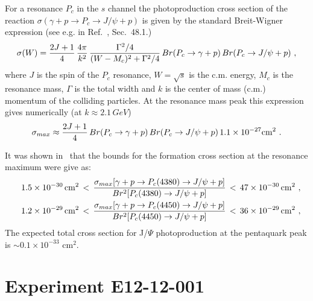\documentclass[12pt]{revtex4}
\begin{document}
For a resonance $P_c$ in the $s$ channel the photoproduction cross section of the reaction 
$\sigma(\gamma + p \to P_c \to J/\psi + p)$
is given by the standard Breit-Wigner expression (see e.g. in Ref.~\cite{pdg}, Sec.~48.1.)
\begin{equation}
\sigma(W) = { 2 J +1 \over 4} \, {4 \pi \over k^2} \, {\Gamma^2/4 \over (W-M_c)^2 + \Gamma^2/4} \, Br(P_c \to \gamma + p) \, Br(P_c \to J/\psi +p)~,
\label{bw}
\end{equation}
where $J$ is the spin of the $P_c$ resonance, $W=\sqrt{s}$  is the c.m. energy,  $M_c$ is the resonance mass, $\Gamma$ is the total width and $k$ is the center of mass (c.m.) momentum of the colliding particles. At the resonance mass peak this expression gives numerically (at $k \approx 2.1\,GeV$)
\begin{equation}
\sigma_{max}\approx { 2 J +1 \over 4} \, Br(P_c \to \gamma + p) \, Br(P_c \to J/\psi +p) \, 1.1 \times 10^{-27} {\rm cm}^2~.
\label{bwm}
\end{equation}

It was shown in~\cite{pt2} that the bounds for the formation cross section at the resonance maximum were give as:
\begin{eqnarray}
&& 1.5 \times 10^{-30}\, {\rm cm^2} \, < \, {\sigma_{max}[\gamma + p \to P_c(4380) \to J/\psi + p] \over Br^2[ P_c(4380) \to J/\psi+p]} \, < \, 47 \times 10^{-30} \, {\rm cm^2}~, \nonumber \\
&& 1.2 \times 10^{-29}\, {\rm cm^2} \, < \, {\sigma_{max}[\gamma + p \to P_c(4450) \to J/\psi + p] \over Br^2 [ P_c(4450) \to J/\psi+p]} \, < \, 36 \times 10^{-29} \, {\rm cm^2}~,
\label{modn}
\end{eqnarray}
The expected total cross section for J/$\Psi$ photoproduction at the pentaquark peak is $\sim 0.1\times 10^{-33}$ cm$^2$.  

\section{Experiment E12-12-001}
\end{document}
